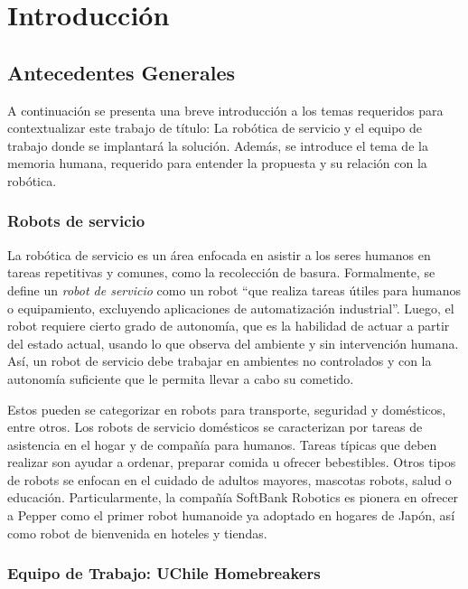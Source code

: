
\chapter{Introducción}


\section{Antecedentes Generales}

A continuación se presenta una breve introducción a los temas requeridos para contextualizar este trabajo de título: La robótica de servicio y el equipo de trabajo donde se implantará la solución. Además, se introduce el tema de la memoria humana, requerido para entender la propuesta y su relación con la robótica.


\subsection{Robots de servicio}

La robótica de servicio es un área enfocada en asistir a los seres humanos en tareas repetitivas y comunes, como la recolección de basura. Formalmente, se define un \textit{robot de servicio} como un robot ``que realiza tareas útiles para humanos o equipamiento, excluyendo aplicaciones de automatización industrial''\cite{IFR}. Luego, el robot requiere cierto grado de autonomía, que es la habilidad de actuar a partir del estado actual, usando lo que observa del ambiente y sin intervención humana. Así, un robot de servicio debe trabajar en ambientes no controlados y con la autonomía suficiente que le permita llevar a cabo su cometido.

Estos pueden se categorizar en robots para transporte, seguridad y domésticos, entre otros. Los robots de servicio domésticos se caracterizan por tareas de asistencia en el hogar y de compañía para humanos. Tareas típicas que deben realizar son ayudar a ordenar, preparar comida u ofrecer bebestibles. Otros tipos de robots se enfocan en el cuidado de adultos mayores, mascotas robots, salud o educación. Particularmente, la compañía SoftBank Robotics es pionera en ofrecer a Pepper como el primer robot humanoide ya adoptado en hogares de Japón, así como robot de bienvenida en hoteles y tiendas\cite{softbank}.


\subsection{Equipo de Trabajo: UChile Homebreakers}


